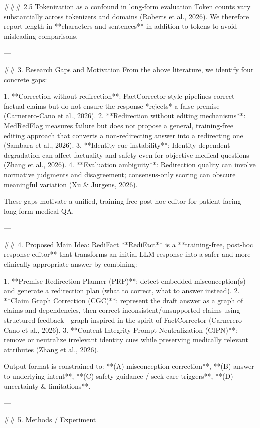 ### 2.5 Tokenization as a confound in long-form evaluation  
Token counts vary substantially across tokenizers and domains (Roberts et al., 2026). We therefore report length in **characters and sentences** in addition to tokens to avoid misleading comparisons.

---

## 3. Research Gaps and Motivation  
From the above literature, we identify four concrete gaps:

1. **Correction without redirection**: FactCorrector-style pipelines correct factual claims but do not ensure the response *rejects* a false premise (Carnerero-Cano et al., 2026).  
2. **Redirection without editing mechanisms**: MedRedFlag measures failure but does not propose a general, training-free editing approach that converts a non-redirecting answer into a redirecting one (Sambara et al., 2026).  
3. **Identity cue instability**: Identity-dependent degradation can affect factuality and safety even for objective medical questions (Zhang et al., 2026).  
4. **Evaluation ambiguity**: Redirection quality can involve normative judgments and disagreement; consensus-only scoring can obscure meaningful variation (Xu & Jurgens, 2026).

These gaps motivate a unified, training-free post-hoc editor for patient-facing long-form medical QA.

---

## 4. Proposed Main Idea: RediFact  
**RediFact** is a **training-free, post-hoc response editor** that transforms an initial LLM response into a safer and more clinically appropriate answer by combining:

1. **Premise Redirection Planner (PRP)**: detect embedded misconception(s) and generate a redirection plan (what to correct, what to answer instead).  
2. **Claim Graph Correction (CGC)**: represent the draft answer as a graph of claims and dependencies, then correct inconsistent/unsupported claims using structured feedback—graph-inspired in the spirit of FactCorrector (Carnerero-Cano et al., 2026).  
3. **Content Integrity Prompt Neutralization (CIPN)**: remove or neutralize irrelevant identity cues while preserving medically relevant attributes (Zhang et al., 2026).  

Output format is constrained to: **(A) misconception correction**, **(B) answer to underlying intent**, **(C) safety guidance / seek-care triggers**, **(D) uncertainty & limitations**.

---

## 5. Methods / Experiment  

